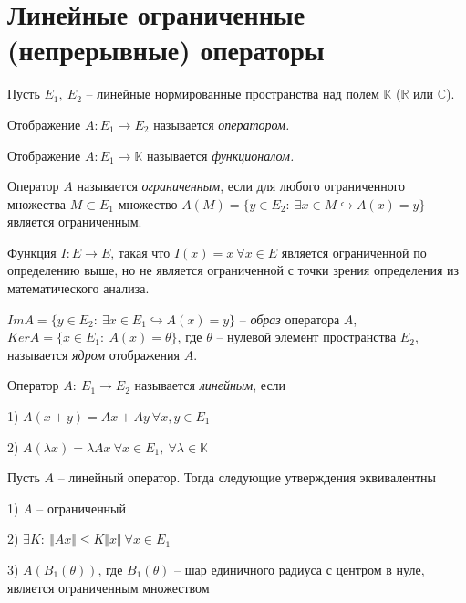 \section{Линейные ограниченные (непрерывные) операторы}

Пусть $\displaystyle E_{1} ,\ E_{2}$ -- линейные нормированные пространства над полем $\displaystyle \mathbb{K}$ ($\displaystyle \mathbb{R}$ или $\displaystyle \mathbb{C}$).
\begin{definition}
Отображение $\displaystyle A:E_{1}\rightarrow E_{2}$ называется \textit{оператором}\textit{.}
\end{definition}
\begin{definition}
Отображение $\displaystyle A:E_{1}\rightarrow \mathbb{K}$ называется \textit{функционалом}\textit{.}
\end{definition}
\begin{definition}
Оператор $\displaystyle A$ называется \textit{ограниченным}, если для любого ограниченного множества $\displaystyle M\subset E_{1}$ множество $\displaystyle A( M) =\{y\in E_{2} :\ \exists x\in M\hookrightarrow A( x) =y\}$ является ограниченным.
\end{definition}
\begin{note}
Функция $\displaystyle I:E\rightarrow E$, такая что $\displaystyle I( x) =x\ \forall x\in E$ является ограниченной по определению выше, но не является ограниченной с точки зрения определения из математического анализа.
\end{note}
\begin{definition}
$\displaystyle ImA=\{y\in E_{2} :\ \exists x\in E_{1} \hookrightarrow A( x) =y\}$ -- \textit{образ} оператора $\displaystyle A$, $\displaystyle KerA=\{x\in E_{1} :\ A( x) =\theta \}$, где $\displaystyle \theta $ -- нулевой элемент пространства $\displaystyle E_{2}$, называется \textit{ядром} отображения $\displaystyle A$.
\end{definition}
\begin{definition}
Оператор $\displaystyle A:\ E_{1}\rightarrow E_{2}$ называется \textit{линейным}, если

1) $\displaystyle A( x+y) =Ax+Ay\ \forall x,y\in E_{1}$

2) $\displaystyle A( \lambda x) =\lambda Ax\ \forall x\in E_{1} ,\ \forall \lambda \in \mathbb{K}$
\end{definition}
\begin{proposition}
Пусть $\displaystyle A$ -- линейный оператор. Тогда следующие утверждения эквивалентны

1) $\displaystyle A$ -- ограниченный

2) $\displaystyle \exists K:\ \Vert Ax\Vert \leqslant K\Vert x\Vert \ \forall x\in E_{1}$

3) $\displaystyle A( B_{1}( \theta ))$, где $\displaystyle B_{1}( \theta )$ -- шар единичного радиуса с центром в нуле, является ограниченным множеством
\end{proposition}
